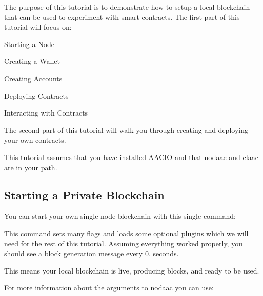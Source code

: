 The purpose of this tutorial is to demonstrate how to setup a local blockchain that can be used to experiment with smart contracts. The first part of this tutorial will focus on\+:


\begin{DoxyEnumerate}
\item Starting a \mbox{\hyperlink{struct_node}{Node}}
\item Creating a Wallet
\item Creating Accounts
\item Deploying Contracts
\item Interacting with Contracts
\end{DoxyEnumerate}

The second part of this tutorial will walk you through creating and deploying your own contracts.

This tutorial assumes that you have installed A\+A\+C\+IO and that {\ttfamily nodaac} and {\ttfamily claac} are in your path.

\subsection*{Starting a Private Blockchain}

You can start your own single-\/node blockchain with this single command\+:




This command sets many flags and loads some optional plugins which we will need for the rest of this tutorial. Assuming everything worked properly, you should see a block generation message every 0. seconds. ~\newline
 


This means your local blockchain is live, producing blocks, and ready to be used.

For more information about the arguments to {\ttfamily nodaac} you can use\+:


